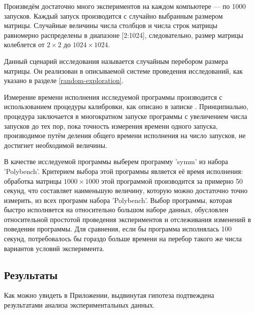 Произведём достаточно много экспериментов на каждом компьютере --- по 1000 запусков. Каждый запуск производится с случайно выбранным размером матрицы. Случайные величины числа столбцов и числа строк матрицы равномерно распределены в диапазоне [2:1024], следовательно, размер матрицы колеблется от $2 \times 2$ до $1024 \times 1024$.

Данный сценарий исследования называется случайным перебором размера матрицы. Он реализован в описываемой системе проведения исследований, как указано в разделе \ref{random-exploration}.

Измерение времени исполнения исследуемой программы производится с использованием процедуры калибровки, как описано в записке \cite{adaptor}. Принципиально, процедура заключается в многократном запуске программы с увеличением числа запусков до тех пор, пока точность измерения времени одного запуска, производимое путём деления общего времени исполнения на число запусков, не достигнет необходимой величины.

В качестве исследуемой программы выберем программу 'symm' из набора 'Polybench'. Критерием выбора этой программы является её время исполнения: обработка матрицы $1000 \times 1000$ этой программой производится за примерно 50 секунд, что составляет наименьшую величину, которую можно достаточно точно измерить, из всех программ набора 'Polybench'. Выбор программы, которая быстро исполняется на относительно большом наборе данных, обусловлен относительной простотой проведения экспериментов и отслеживания изменений в поведении программы. Для сравнения, если бы программа исполнялась 100 секунд, потребовалось бы гораздо больше времени на перебор такого же числа вариантов условий эксперимента.

\subsection{Результаты}

Как можно увидеть в Приложении, выдвинутая гипотеза подтвеждена результатами анализа экспериментальных данных.